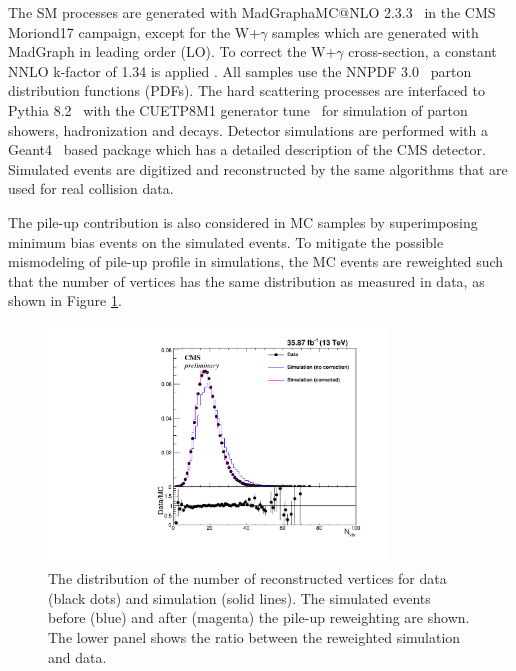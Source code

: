 \documentclass[thesis.tex]{subfiles}
\renewcommand\_{\textunderscore\allowbreak}
\begin{document}
The SM processes are generated with MadGraph\_aMC@NLO 2.3.3~\cite{madgraph233} in the CMS Moriond17 campaign, except for the W+$\gamma$ samples which are generated with MadGraph in leading order (LO). 
To correct the W+$\gamma$ cross-section, a constant NNLO k-factor of 1.34 is applied \cite{K:MonoPho, K:Bozzi}.
All samples use the NNPDF 3.0~\cite{pdfNNPDF} parton distribution functions (PDFs). 
The hard scattering processes  are interfaced to Pythia 8.2~\cite{pythia82} with the CUETP8M1 generator tune~\cite{cmstune} for simulation of parton showers,  hadronization and decays. 
Detector simulations are performed with a Geant4~\cite{Agostinelli:2002hh} based package which has a detailed description of the CMS detector. 
Simulated events are digitized and reconstructed by the same algorithms that are used for real collision data. 

The pile-up contribution is also considered in MC samples by superimposing minimum bias events on the simulated events. 
To mitigate the possible mismodeling of pile-up profile in simulations, the MC events are reweighted such that the number of vertices has the same distribution as measured in data, as shown in Figure \ref{fig:PUreweight}.

\begin{figure}[tb]
  \centering
    \includegraphics[width=0.8\textwidth]{Figures/PLOT_PUreweight.pdf}
  \caption{The distribution of the number of reconstructed vertices for data (black dots) and simulation (solid lines). The simulated events before (blue) and after (magenta) the pile-up reweighting are shown. The lower panel shows the ratio between the reweighted simulation and data.} 
  \label{fig:PUreweight}
\end{figure}
\end{document}
